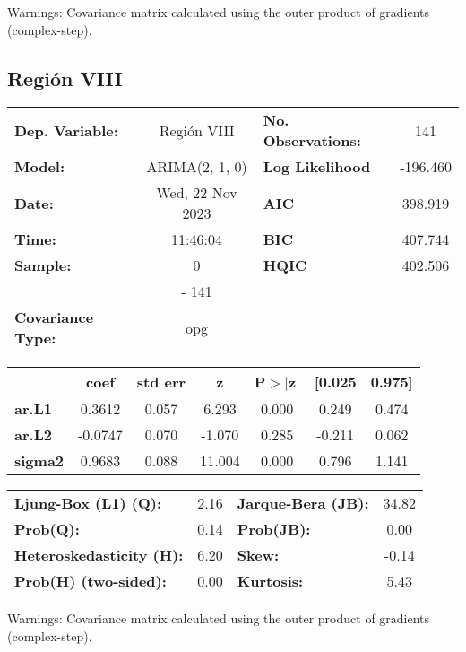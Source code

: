 \documentclass{article}%
\begin{document}
Warnings: \newline
 [1] Covariance matrix calculated using the outer product of gradients (complex-step).%
\subsection*{Región VIII}%
\begin{center}
\begin{tabular}{lclc}
\toprule
\textbf{Dep. Variable:}          &   Región VIII    & \textbf{  No. Observations:  } &    141      \\
\textbf{Model:}                  &  ARIMA(2, 1, 0)  & \textbf{  Log Likelihood     } &  -196.460   \\
\textbf{Date:}                   & Wed, 22 Nov 2023 & \textbf{  AIC                } &  398.919    \\
\textbf{Time:}                   &     11:46:04     & \textbf{  BIC                } &  407.744    \\
\textbf{Sample:}                 &        0         & \textbf{  HQIC               } &  402.506    \\
\textbf{}                        &       - 141      & \textbf{                     } &             \\
\textbf{Covariance Type:}        &       opg        & \textbf{                     } &             \\
\bottomrule
\end{tabular}
\begin{tabular}{lcccccc}
                & \textbf{coef} & \textbf{std err} & \textbf{z} & \textbf{P$> |$z$|$} & \textbf{[0.025} & \textbf{0.975]}  \\
\midrule
\textbf{ar.L1}  &       0.3612  &        0.057     &     6.293  &         0.000        &        0.249    &        0.474     \\
\textbf{ar.L2}  &      -0.0747  &        0.070     &    -1.070  &         0.285        &       -0.211    &        0.062     \\
\textbf{sigma2} &       0.9683  &        0.088     &    11.004  &         0.000        &        0.796    &        1.141     \\
\bottomrule
\end{tabular}
\begin{tabular}{lclc}
\textbf{Ljung-Box (L1) (Q):}     & 2.16 & \textbf{  Jarque-Bera (JB):  } & 34.82  \\
\textbf{Prob(Q):}                & 0.14 & \textbf{  Prob(JB):          } &  0.00  \\
\textbf{Heteroskedasticity (H):} & 6.20 & \textbf{  Skew:              } & -0.14  \\
\textbf{Prob(H) (two-sided):}    & 0.00 & \textbf{  Kurtosis:          } &  5.43  \\
\bottomrule
\end{tabular}
\end{center}

Warnings: \newline
 [1] Covariance matrix calculated using the outer product of gradients (complex-step).

%
\end{document}
